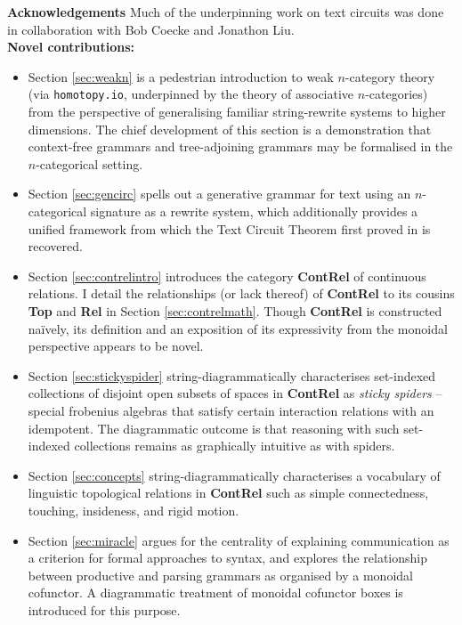 \clearpage
\newpage
\vfill
\begin{myboxB}
\centering
\textbf{Acknowledgements}
Much of the underpinning work on text circuits was done in collaboration with Bob Coecke and Jonathon Liu.\\

\textbf{Novel contributions:}
\begin{itemize}

\item Section \ref{sec:weakn} is a pedestrian introduction to weak $n$-category theory (via \texttt{homotopy.io}, underpinned by the theory of associative $n$-categories) from the perspective of generalising familiar string-rewrite systems to higher dimensions. The chief development of this section is a demonstration that context-free grammars and tree-adjoining grammars may be formalised in the $n$-categorical setting.

\item Section \ref{sec:gencirc} spells out a generative grammar for text using an $n$-categorical signature as a rewrite system, which additionally provides a unified framework from which the Text Circuit Theorem first proved in \citep{wang-mascianica_distilling_2023} is recovered.

\item Section \ref{sec:contrelintro} introduces the category \textbf{ContRel} of continuous relations. I detail the relationships (or lack thereof) of \textbf{ContRel} to its cousins \textbf{Top} and \textbf{Rel} in Section \ref{sec:contrelmath}. Though \textbf{ContRel} is constructed na\"{i}vely, its definition and an exposition of its expressivity from the monoidal perspective appears to be novel.

\item Section \ref{sec:stickyspider} string-diagrammatically characterises set-indexed collections of disjoint open subsets of spaces in \textbf{ContRel} as \emph{sticky spiders} -- special frobenius algebras that satisfy certain interaction relations with an idempotent. The diagrammatic outcome is that reasoning with such set-indexed collections remains as graphically intuitive as with spiders.

\item Section \ref{sec:concepts} string-diagrammatically characterises a vocabulary of linguistic topological relations in \textbf{ContRel} such as simple connectedness, touching, insideness, and rigid motion.

\item Section \ref{sec:miracle} argues for the centrality of explaining communication as a criterion for formal approaches to syntax, and explores the relationship between productive and parsing grammars as organised by a monoidal cofunctor. A diagrammatic treatment of monoidal cofunctor boxes is introduced for this purpose.


\end{itemize}
\end{myboxB}
